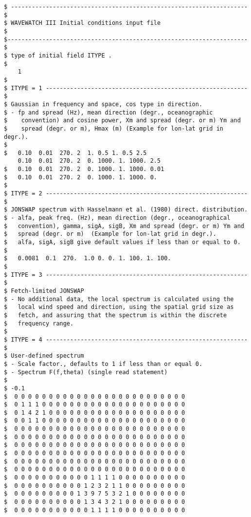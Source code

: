 \begin{verbatim}
$ -------------------------------------------------------------------- $
$ WAVEWATCH III Initial conditions input file                          $
$--------------------------------------------------------------------- $
$ type of initial field ITYPE .
$
    1
$
$ ITYPE = 1 ---------------------------------------------------------- $
$ Gaussian in frequency and space, cos type in direction.
$ - fp and spread (Hz), mean direction (degr., oceanographic
$    convention) and cosine power, Xm and spread (degr. or m) Ym and
$    spread (degr. or m), Hmax (m) (Example for lon-lat grid in degr.).
$
$   0.10  0.01  270. 2  1. 0.5 1. 0.5 2.5
    0.10  0.01  270. 2  0. 1000. 1. 1000. 2.5
$   0.10  0.01  270. 2  0. 1000. 1. 1000. 0.01
$   0.10  0.01  270. 2  0. 1000. 1. 1000. 0.
$
$ ITYPE = 2 ---------------------------------------------------------- $
$ JONSWAP spectrum with Hasselmann et al. (1980) direct. distribution.
$ - alfa, peak freq. (Hz), mean direction (degr., oceanographical
$   convention), gamma, sigA, sigB, Xm and spread (degr. or m) Ym and
$   spread (degr. or m)  (Example for lon-lat grid in degr.).
$   alfa, sigA, sigB give default values if less than or equal to 0.
$
$   0.0081  0.1  270.  1.0 0. 0. 1. 100. 1. 100.
$
$ ITYPE = 3 ---------------------------------------------------------- $
$ Fetch-limited JONSWAP
$ - No additional data, the local spectrum is calculated using the
$   local wind speed and direction, using the spatial grid size as
$   fetch, and assuring that the spectrum is within the discrete
$   frequency range.
$
$ ITYPE = 4 ---------------------------------------------------------- $
$ User-defined spectrum
$ - Scale factor., defaults to 1 if less than or equal 0.
$ - Spectrum F(f,theta) (single read statement)
$
$ -0.1
$  0 0 0 0 0 0 0 0 0 0 0 0 0 0 0 0 0 0 0 0 0 0 0 0 0
$  0 1 1 1 0 0 0 0 0 0 0 0 0 0 0 0 0 0 0 0 0 0 0 0 0
$  0 1 4 2 1 0 0 0 0 0 0 0 0 0 0 0 0 0 0 0 0 0 0 0 0
$  0 0 1 1 0 0 0 0 0 0 0 0 0 0 0 0 0 0 0 0 0 0 0 0 0
$  0 0 0 0 0 0 0 0 0 0 0 0 0 0 0 0 0 0 0 0 0 0 0 0 0
$  0 0 0 0 0 0 0 0 0 0 0 0 0 0 0 0 0 0 0 0 0 0 0 0 0
$  0 0 0 0 0 0 0 0 0 0 0 0 0 0 0 0 0 0 0 0 0 0 0 0 0
$  0 0 0 0 0 0 0 0 0 0 0 0 0 0 0 0 0 0 0 0 0 0 0 0 0
$  0 0 0 0 0 0 0 0 0 0 0 0 0 0 0 0 0 0 0 0 0 0 0 0 0
$  0 0 0 0 0 0 0 0 0 0 0 0 0 0 0 0 0 0 0 0 0 0 0 0 0
$  0 0 0 0 0 0 0 0 0 0 0 1 1 1 1 0 0 0 0 0 0 0 0 0 0
$  0 0 0 0 0 0 0 0 0 0 1 2 3 2 1 1 0 0 0 0 0 0 0 0 0
$  0 0 0 0 0 0 0 0 0 1 3 9 7 5 3 2 1 0 0 0 0 0 0 0 0
$  0 0 0 0 0 0 0 0 0 0 1 3 4 3 2 1 0 0 0 0 0 0 0 0 0
$  0 0 0 0 0 0 0 0 0 0 0 1 1 1 1 0 0 0 0 0 0 0 0 0 0

\end{verbatim}
